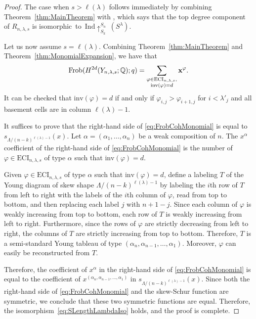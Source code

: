 \documentclass[12pt]{amsart}
\newcommand{\Frob}{\mathrm{Frob}}
\newcommand{\la}{\lambda}
\newcommand{\inv}{\mathrm{inv}}
\begin{document}
\begin{proof}
The case when $s>\ell(\lambda)$ follows immediately by combining Theorem~\ref{thm:MainTheorem} with \cite[Corollary 3.3.15]{GriffinThesis}, which says that the top degree component of $R_{n,\lambda,s}$ is isomorphic~to~$\mathrm{Ind}\!\uparrow_{S_k}^{S_n}~\!(S^\lambda)$.

Let us now assume $s=\ell(\lambda)$. Combining Theorem~\ref{thm:MainTheorem} and  Theorem~\ref{thm:MonomialExpansion}, we have that
\begin{align}\label{eq:FrobCohMonomial}
    \Frob(H^{2d}(Y_{n,\lambda,s};\bQ);q) = \sum_{\substack{\varphi \in \mathrm{ECI}_{n,\lambda,s},\\ \mathrm{inv}(\varphi)=d}} \mathbf{x}^\varphi.
\end{align}
It can be checked that $\inv(\varphi) = d$  if and only if $\varphi_{i,j} > \varphi_{i+1,j}$ for $i<\lambda'_j$ and all basement cells are in column $\ell(\lambda)-1$.

It suffices to prove that the right-hand side of \eqref{eq:FrobCohMonomial} is equal to $s_{\Lambda/(n-k)^{\ell(\la)-1}}(x)$. Let $\alpha = (\alpha_1,\dots, \alpha_n)$ be a weak composition of $n$.
The $x^\alpha$ coefficient of the right-hand side of \eqref{eq:FrobCohMonomial} is the number of $\varphi\in \mathrm{ECI}_{n,\la,s}$ of type $\alpha$ such that $\mathrm{inv}(\varphi) = d$. 

Given $\varphi\in \mathrm{ECI}_{n,\la,s}$ of type $\alpha$ such that $\mathrm{inv}(\varphi) = d$, define a labeling $T$ of the Young diagram of skew shape $\Lambda/(n-k)^{\ell(\lambda)-1}$ by labeling the $i$th row of $T$ from left to right with the labels of the $i$th column of $\varphi$, read from top to bottom, and then replacing each label $j$ with $n+1-j$. Since each column of $\varphi$ is weakly increasing from top to bottom, each row of $T$ is weakly increasing from left to right. Furthermore, since the rows of $\varphi$ are strictly decreasing from left to right, the columns of $T$ are strictly increasing from top to bottom. Therefore, $T$ is a semi-standard Young tableau of type $(\alpha_n,\alpha_{n-1},\dots, \alpha_1)$. Moreover, $\varphi$ can easily be reconstructed from $T$. 

Therefore, the coefficient of $x^\alpha$ in the right-hand side of \eqref{eq:FrobCohMonomial} is equal to the coefficient of $x^{(\alpha_n,\alpha_{n-1},\dots, \alpha_1)}$ in $s_{\Lambda/(n-k)^{\ell(\la)-1}}(x)$. Since both the right-hand side of \eqref{eq:FrobCohMonomial} and the skew-Schur function are symmetric, we conclude that these two symmetric functions are equal. Therefore, the isomorphism~\eqref{eq:SLengthLambdaIso} holds, and the proof is complete.
\end{proof}
\end{document}
